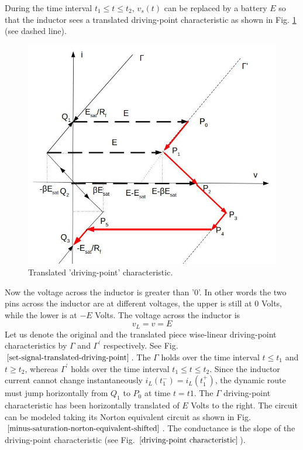 \documentclass[12pt,a4paper,tweside,onehalfspacing]{article}
\begin{document}
During the  time interval $t_1 \leq t \leq t_2$, $v_s(t)$ can be replaced by a battery $E$ so that the inductor sees a translated driving-point characteristic as shown in Fig. \ref{set-signal-translated-driving-point} (see dashed line).
%
\begin{figure}[!ht]
        \centering \includegraphics[width=0.9\columnwidth]{driving-point-characteristic-shifted.jpg}
        \caption{\label{set-signal-translated-driving-point}Translated 'driving-point' characteristic.
        }
\end{figure}
Now the voltage across the inductor is greater than '0'. In other words the two pins across the inductor are at different voltages, the upper is still at $0$ Volts, while the lower is at $-E$ Volts. The voltage across the inductor is
\begin{equation}
    v_L=v=E
\end{equation}
Let us denote the original and the translated piece wise-linear driving-point characteristics by $\Gamma$ and $\Gamma^{'}$ respectively. See Fig. $\ref{set-signal-translated-driving-point}$. The $\Gamma$ holds over the time interval $t \leq t_1$ and $t\geq t_2$, whereas $\Gamma^{'}$ holds over the time interval $t_1 \leq t \leq t_2$.
Since the inductor current cannot change instantaneously $i_L(t_1^{-})=i_L(t_1^{+})$, the dynamic route must jump horizontally from $Q_1$ to $P_0$ at time $t=t1$. The $\Gamma$ driving-point characteristic has been horizontally translated of $E$ Volts to the right.
The circuit can be modeled taking its Norton equivalent circuit as shown in Fig. $\ref{minus-saturation-norton-equivalent-shifted}$. The conductance is the slope of the driving-point characteristic (see Fig. $\ref{driving-point characteristic}$).
\end{document}
